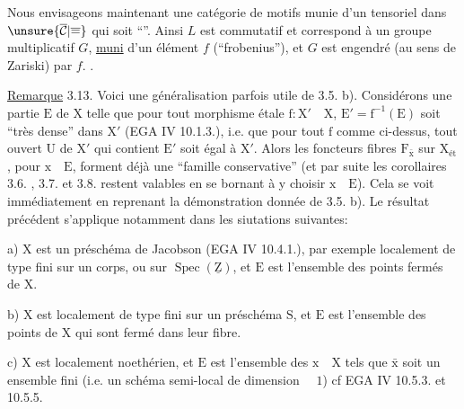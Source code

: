 
Nous envisageons maintenant une 
catégorie de motifs munie d'un
  tensoriel dans $\unsure{\overline{\mathcal C}|\overline{=}}$
qui soit ``''. Ainsi $L$ est commutatif
et correspond à un groupe  
 multiplicatif $G$, \uline{muni} d'un
élément $f$ (``frobenius''), et $G$ est
engendré (au sens de Zariski) par
$f$. 
.

\uline{Remarque} 3.13. Voici une généralisation parfois utile de 3.5. b). Considérons
une partie $\mathrm{E}$ de $\mathrm{X}$ telle que pour tout morphisme étale $\mathrm{f:X'\quad X}$, $\mathrm{E'=f^{-1}(E)}$
soit ``très dense'' dans $\mathrm{X'}$ (EGA IV 10.1.3.), i.e. que pour tout $\mathrm{f}$ comme ci-dessus,
tout ouvert $\mathrm{U}$ de $\mathrm{X'}$ qui contient $\mathrm{E'}$ soit égal à $\mathrm{X'}$. Alors les foncteurs
fibres $\mathrm{F_{\bar x}}$ sur $\mathrm{X_{\text{ét}}}$, pour $\mathrm{x\quad E}$, forment déjà une ``famille conservative''
(et par suite les corollaires 3.6. , 3.7. et 3.8. restent valables
en se bornant à y choisir $\mathrm{x\quad E}$). Cela se voit immédiatement en reprenant la
démonstration donnée de 3.5. b). Le résultat précédent s'applique notamment
dans les siutations suivantes:

a) $\mathrm{X}$ est un préschéma de Jacobson (EGA IV 10.4.1.), par exemple localement
de type fini sur un corps, ou sur $\mathrm{\operatorname{Spec}(\underline{Z})}$, et $\mathrm{E}$ est l'ensemble des
points fermés de $\mathrm{X}$.

b) $\mathrm{X}$ est localement de type fini sur un préschéma $\mathrm{S}$, et $\mathrm{E}$ est l'ensemble
des points de $\mathrm{X}$ qui sont fermé dans leur fibre.

c) $\mathrm{X}$ est localement noethérien, et $\mathrm{E}$ est l'ensemble des $\mathrm{x\quad X}$ tels que
$\mathrm{\bar x}$ soit un ensemble fini (i.e. un schéma semi-local de dimension $\mathrm{\quad 1}$) cf
EGA IV 10.5.3. et 10.5.5.

